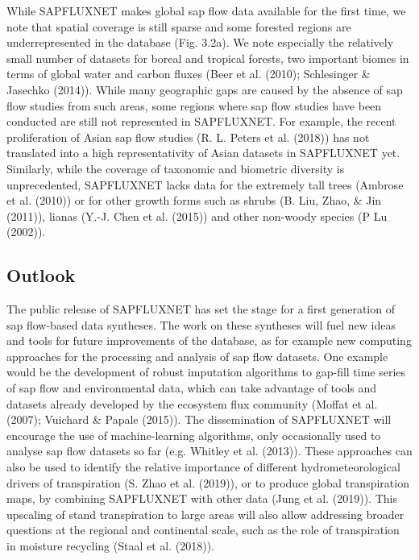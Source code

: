 \documentclass[11pt,twoside]{reedthesis}
\begin{document}
While SAPFLUXNET makes global sap flow data available for the first
time, we note that spatial coverage is still sparse and some forested
regions are underrepresented in the database (Fig. 3.2a). We note
especially the relatively small number of datasets for boreal and
tropical forests, two important biomes in terms of global water and
carbon fluxes (Beer et al. (2010); Schlesinger \& Jasechko (2014)).
While many geographic gaps are caused by the absence of sap flow studies
from such areas, some regions where sap flow studies have been conducted
are still not represented in SAPFLUXNET. For example, the recent
proliferation of Asian sap flow studies (R. L. Peters et al. (2018)) has
not translated into a high representativity of Asian datasets in
SAPFLUXNET yet. Similarly, while the coverage of taxonomic and biometric
diversity is unprecedented, SAPFLUXNET lacks data for the extremely tall
trees (Ambrose et al. (2010)) or for other growth forms such as shrubs
(B. Liu, Zhao, \& Jin (2011)), lianas (Y.-J. Chen et al. (2015)) and
other non-woody species (P Lu (2002)).\par

\subsection{Outlook}\label{outlook}

The public release of SAPFLUXNET has set the stage for a first
generation of sap flow-based data syntheses. The work on these syntheses
will fuel new ideas and tools for future improvements of the database,
as for example new computing approaches for the processing and analysis
of sap flow datasets. One example would be the development of robust
imputation algorithms to gap-fill time series of sap flow and
environmental data, which can take advantage of tools and datasets
already developed by the ecosystem flux community (Moffat et al. (2007);
Vuichard \& Papale (2015)). The dissemination of SAPFLUXNET will
encourage the use of machine-learning algorithms, only occasionally used
to analyse sap flow datasets so far (e.g. Whitley et al. (2013)). These
approaches can also be used to identify the relative importance of
different hydrometeorological drivers of transpiration (S. Zhao et al.
(2019)), or to produce global transpiration maps, by combining
SAPFLUXNET with other data (Jung et al. (2019)). This upscaling of stand
transpiration to large areas will also allow addressing broader
questions at the regional and continental scale, such as the role of
transpiration in moisture recycling (Staal et al. (2018)).\par
\end{document}
